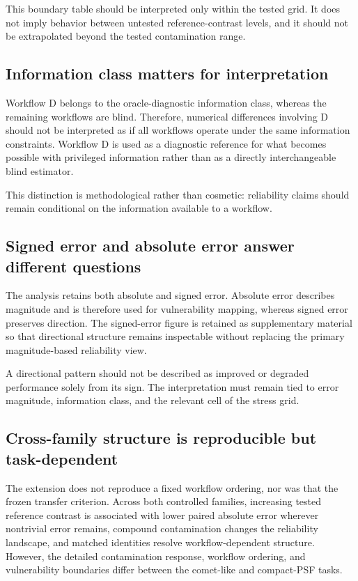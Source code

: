 This boundary table should be interpreted only within the tested grid.
\cite{ref6} It does not imply behavior between untested reference-contrast levels,
and it should not be extrapolated beyond the tested contamination range.

\subsection{Information class matters for
interpretation}\label{information-class-matters-for-interpretation}

Workflow D belongs to the oracle-diagnostic information class, whereas the remaining workflows are
blind. Therefore, numerical differences involving D should not be
interpreted as if all workflows operate under the same information
constraints. Workflow D is used as a diagnostic reference for what
becomes possible with privileged information rather than as a directly
interchangeable blind estimator.

This distinction is methodological rather than cosmetic: reliability
claims should remain conditional on the information available to a
workflow.

\subsection{Signed error and absolute error answer different
questions}\label{signed-error-and-absolute-error-answer-different-questions}

The analysis retains both absolute and signed error. Absolute error
describes magnitude and is therefore used for vulnerability mapping,
whereas signed error preserves direction. The signed-error figure is
retained as supplementary material so that directional structure remains
inspectable without replacing the primary magnitude-based reliability
view.

A directional pattern should not be described as improved or degraded
performance solely from its sign. The interpretation must remain tied to
error magnitude, information class, and the relevant cell of the stress
grid.

\subsection{Cross-family structure is reproducible but
task-dependent}\label{cross-family-structure}

The extension does not reproduce a fixed workflow ordering, nor was
that the frozen transfer criterion. Across both controlled
families, increasing tested reference contrast is associated with lower
paired absolute error wherever nontrivial error remains, compound
contamination changes the reliability landscape, and matched identities
resolve workflow-dependent structure. However, the detailed
contamination response, workflow ordering, and vulnerability boundaries
differ between the comet-like and compact-PSF tasks.

